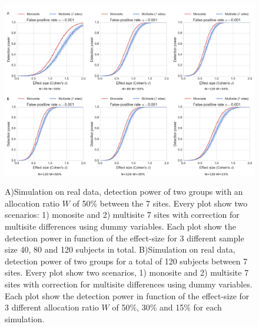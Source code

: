 \documentclass[authoryear]{elsarticle}
\begin{document}
\begin{figure}[tbp]
\centering
\captionsetup[subfloat]{labelformat=empty}
{\includegraphics[width=\textwidth]{../figures/simulations_real_7sites.png}}

\caption{
A)Simulation on real data, detection power of two groups with an allocation ratio $W$ of 50\% between the 7 sites. Every plot show two scenarios: 1) monosite and 2) multisite 7 sites with correction for multisite differences using dummy variables. Each plot show the detection power in function of the effect-size for 3 different sample size 40, 80 and 120 subjects in total.
B)Simulation on real data, detection power of two groups for a total of 120 subjects between 7 sites. Every plot show two scenarios, 1) monosite and 2) multisite 7 sites with correction for multisite differences using dummy variables. Each plot show the detection power in function of the effect-size for 3 different allocation ratio $W$ of 50\%, 30\% and 15\% for each simulation.
}
\label{fig_real_sim}
\end{figure}
\end{document}
